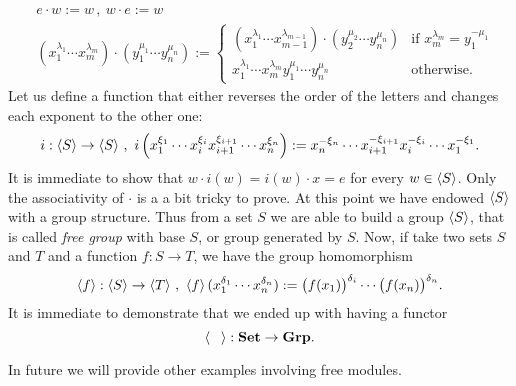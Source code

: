 \begin{example}
\[\begin{aligned}
& e \cdot w := w \,, \ w \cdot e := w \\
& (x_1^{\lambda_1} \cdots{} x_m^{\lambda_m}) \cdot (y_1^{\mu_1} \cdots{} y_n^{\mu_n}) :=
\begin{cases} (x_1^{\lambda_1} \cdots{} x_{m-1}^{\lambda_{m-1}}) \cdot (y_2^{\mu_2} \cdots{} y_n^{\mu_n}) & \text{if } x_{m}^{\lambda_m} = y_1^{-\mu_1} \\ x_1^{\lambda_1} \cdots{} x_m^{\lambda_m} y_1^{\mu_1} \cdots{} y_n^{\mu_n} & \text{otherwise.} \end{cases}
\end{aligned}\]
Let us define a function that either reverses the order of the letters and changes each exponent to the other one:
\[i : \left\langle S\right\rangle \to \left\langle S\right\rangle \,, \ i\left( x_1^{\xi_1} \cdots{} x_i^{\xi_i} x_{i+1}^{\xi_{i+1}} \cdots{} x_n^{\xi_n} \right) := x_n^{-\xi_n} \cdots{} x_{i+1}^{-\xi_{i+1}} x_i^{-\xi_i} \cdots{} x_1^{-\xi_1} .\]
It is immediate to show that \(w \cdot i(w) = i(w) \cdot x = e\) for every \(w \in \left\langle S\right\rangle\). Only the associativity of \(\cdot\) is a a bit tricky to prove. At this point we have endowed \(\left\langle S\right\rangle\) with a group structure.\newline
Thus from a set \(S\) we are able to build a group \(\left\langle S\right\rangle\), that is called {\em free group} with base \(S\), or group generated by \(S\). Now, if take two sets \(S\) and \(T\) and a function \(f : S \to T\), we have the group homomorphism
\[\left\langle f\right\rangle : \left\langle S\right\rangle \to \left\langle T\right\rangle \,, \ \left\langle f\right\rangle (x_1^{\delta_1} \cdots{} x_n^{\delta_n}) := \big(f(x_1)\big)^{\delta_i} \cdots{} \big(f(x_n)\big)^{\delta_n} .\]
It is immediate to demonstrate that we ended up with having a functor
\[\angled{\phantom\square} : \Set \to \Grp .\]
\end{example}

In future we will provide other examples involving free modules.

